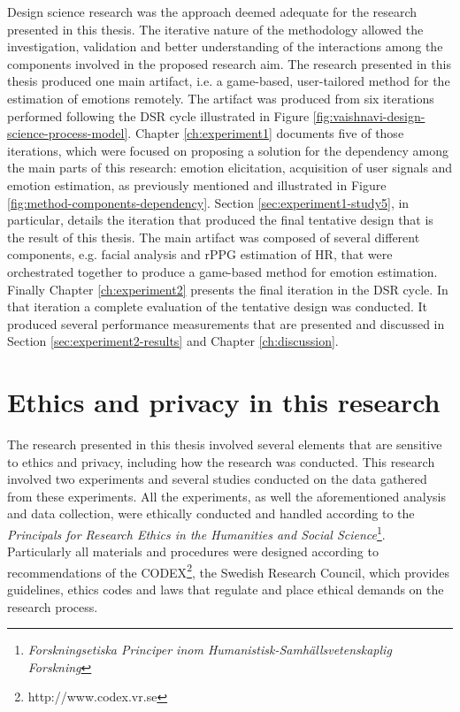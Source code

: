 Design science research was the approach deemed adequate for the research presented in this thesis. The iterative nature of the methodology allowed the investigation, validation and better understanding of the interactions among the components involved in the proposed research aim. The research presented in this thesis produced one main artifact, i.e. a game-based, user-tailored method for the estimation of emotions remotely. The artifact was produced from six iterations performed following the DSR cycle illustrated in Figure \ref{fig:vaishnavi-design-science-process-model}. Chapter \ref{ch:experiment1} documents five of those iterations, which were focused on proposing a solution for the dependency among the main parts of this research: emotion elicitation, acquisition of user signals and emotion estimation, as previously mentioned and illustrated in Figure \ref{fig:method-components-dependency}. Section \ref{sec:experiment1-study5}, in particular, details the iteration that produced the final tentative design that is the result of this thesis. The main artifact was composed of several different components, e.g. facial analysis and rPPG estimation of HR, that were orchestrated together to produce a game-based method for emotion estimation. Finally Chapter \ref{ch:experiment2} presents the final iteration in the DSR cycle. In that iteration a complete evaluation of the tentative design was conducted. It produced several performance measurements that are presented and discussed in Section \ref{sec:experiment2-results} and Chapter \ref{ch:discussion}.

\section{Ethics and privacy in this research}
\label{sec:ethics-this-research}

The research presented in this thesis involved several elements that are sensitive to ethics and privacy, including how the research was conducted. This research involved two experiments and several studies conducted on the data gathered from these experiments. All the experiments, as well the aforementioned analysis and data collection, were ethically conducted and handled according to the \textit{Principals for Research Ethics in the Humanities and Social Science}\footnote{\textit{Forskningsetiska Principer inom Humanistisk-Samhällsvetenskaplig Forskning}}. Particularly all materials and procedures were designed according to recommendations of the CODEX\footnote{http://www.codex.vr.se}, the Swedish Research Council, which provides guidelines, ethics codes and laws that regulate and place ethical demands on the research process.

